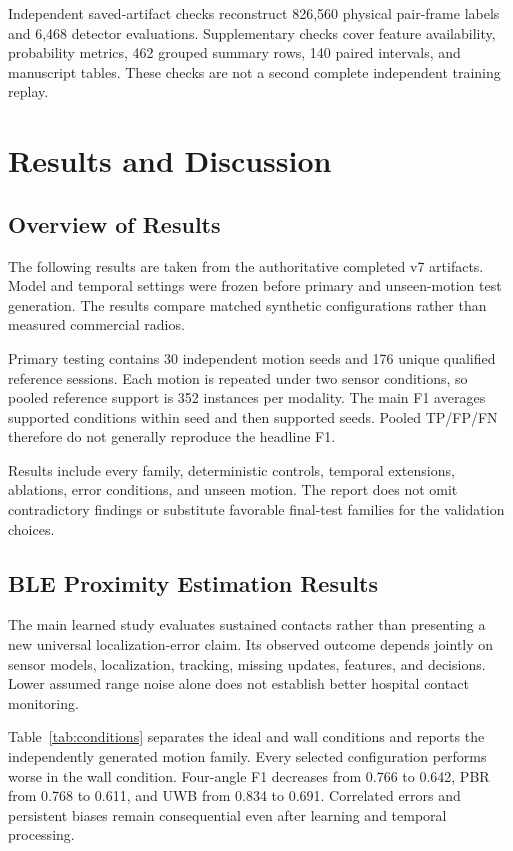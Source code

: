 \documentclass[12pt,a4paper]{report}
\begin{document}
Independent saved-artifact checks reconstruct 826,560 physical pair-frame labels and 6,468 detector evaluations. Supplementary checks cover feature availability, probability metrics, 462 grouped summary rows, 140 paired intervals, and manuscript tables. These checks are not a second complete independent training replay.


\chapter{Results and Discussion}

\section{Overview of Results}
The following results are taken from the authoritative completed v7 artifacts. Model and temporal settings were frozen before primary and unseen-motion test generation. The results compare matched synthetic configurations rather than measured commercial radios.

Primary testing contains 30 independent motion seeds and 176 unique qualified reference sessions. Each motion is repeated under two sensor conditions, so pooled reference support is 352 instances per modality. The main F1 averages supported conditions within seed and then supported seeds. Pooled TP/FP/FN therefore do not generally reproduce the headline F1.

Results include every family, deterministic controls, temporal extensions, ablations, error conditions, and unseen motion. The report does not omit contradictory findings or substitute favorable final-test families for the validation choices.

\section{BLE Proximity Estimation Results}
The main learned study evaluates sustained contacts rather than presenting a new universal localization-error claim. Its observed outcome depends jointly on sensor models, localization, tracking, missing updates, features, and decisions. Lower assumed range noise alone does not establish better hospital contact monitoring.

Table~\ref{tab:conditions} separates the ideal and wall conditions and reports the independently generated motion family. Every selected configuration performs worse in the wall condition. Four-angle F1 decreases from 0.766 to 0.642, PBR from 0.768 to 0.611, and UWB from 0.834 to 0.691. Correlated errors and persistent biases remain consequential even after learning and temporal processing.
\end{document}
